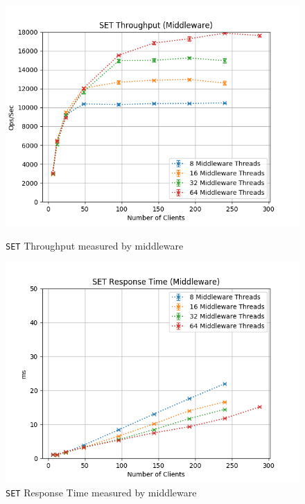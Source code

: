 \documentclass[11pt,a4paper]{article}
\begin{document}
%
\begin{figure}[H]
	\centering
    \begin{minipage}{0.5\textwidth}
        \centering
        \includegraphics[width=\textwidth]{../illustrations/plots/2_2_two_middlewares/1-0/middleware_set_tp_s.png}
        \caption{\texttt{SET} Throughput measured by middleware}
        \label{fig:one_middleware_set_tp_mw}
    \end{minipage}\hfill
    \begin{minipage}{0.5\textwidth}
        \centering
        \includegraphics[width=\textwidth]{../illustrations/plots/2_2_two_middlewares/1-0/middleware_set_rt_ms.png}
        \caption{\texttt{SET} Response Time measured by middleware}
        \label{fig:one_middleware_set_rt_mw}
    \end{minipage}
\end{figure}
%
\end{document}
